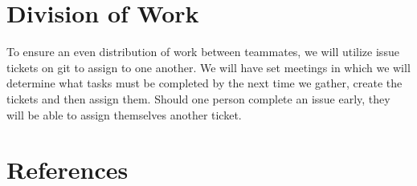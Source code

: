 \documentclass[11pt]{article}
\begin{document}
\section{Division of Work}
To ensure an even distribution of work between teammates, we will utilize issue tickets on git to assign to one another. We will have set meetings in which
we will determine what tasks must be completed by the next time we gather, create the tickets and then assign them. Should one person complete an issue early,
they will be able to assign themselves another ticket.

\section{References}


\end{document}
